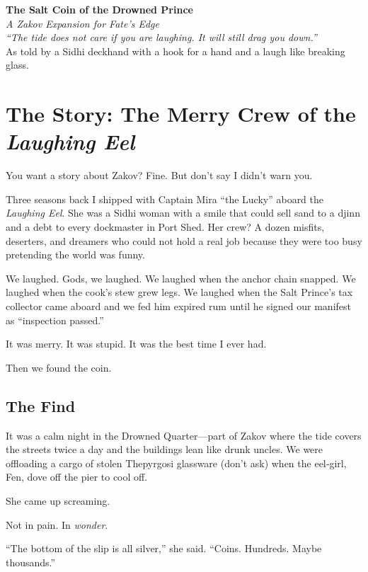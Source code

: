 \documentclass[12pt]{article}
\begin{document}
\begin{center}
    {\LARGE\bfseries The Salt Coin of the Drowned Prince}\\[4pt]
    {\large\itshape A Zakov Expansion for Fate's Edge}\\[12pt]
    \textit{``The tide does not care if you are laughing. It will still drag you down.''}\\[24pt]
    {\large As told by a Sidhi deckhand with a hook for a hand and a laugh like breaking glass.}
\end{center}
\vspace{1em}

\section*{The Story: The Merry Crew of the \textit{Laughing Eel}}

You want a story about Zakov? Fine. But don't say I didn't warn you.

Three seasons back I shipped with Captain Mira “the Lucky” aboard the \textit{Laughing Eel}. She was a Sidhi woman with a smile that could sell sand to a djinn and a debt to every dockmaster in Port Shed. Her crew? A dozen misfits, deserters, and dreamers who could not hold a real job because they were too busy pretending the world was funny.

We laughed. Gods, we laughed. We laughed when the anchor chain snapped. We laughed when the cook's stew grew legs. We laughed when the Salt Prince's tax collector came aboard and we fed him expired rum until he signed our manifest as “inspection passed.” 

It was merry. It was stupid. It was the best time I ever had.

Then we found the coin.

\subsection*{The Find}
It was a calm night in the Drowned Quarter—part of Zakov where the tide covers the streets twice a day and the buildings lean like drunk uncles. We were offloading a cargo of stolen Thepyrgosi glassware (don’t ask) when the eel‑girl, Fen, dove off the pier to cool off.

She came up screaming.

Not in pain. In \textit{wonder}.

“The bottom of the slip is all silver,” she said. “Coins. Hundreds. Maybe thousands.”
\end{document}
